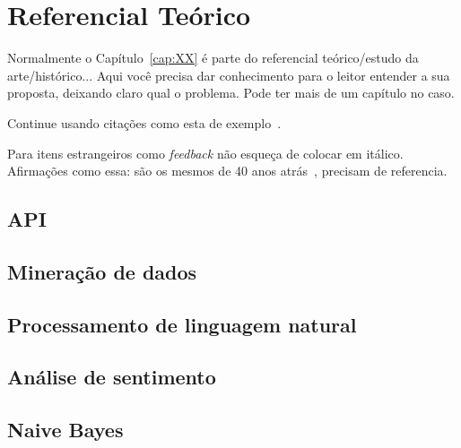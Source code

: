 \chapter{Referencial Teórico}\label{cap:referencial_teorico}

Normalmente o Capítulo~\ref{cap:XX} é parte do referencial teórico/estudo da arte/histórico... Aqui você precisa dar conhecimento para o leitor entender a sua proposta, deixando claro qual o problema. Pode ter mais de um capítulo no caso.


Continue usando citações como esta de exemplo~\cite{fangxing2010,gungor2011}.

Para itens estrangeiros como \textit{feedback}  não esqueça de colocar em itálico. Afirmações como essa: são os mesmos de 40 anos atrás~\cite{gungor2011}, precisam de referencia. 

\section{API}\label{sec:api}


\section{Mineração de dados}\label{sec:mineracao_dados}


\section{Processamento de linguagem natural}\label{sec:nlp}


\section{Análise de sentimento}\label{sec:analise_sentimento}


\section{Naive Bayes}\label{sec:naive_bayes}

